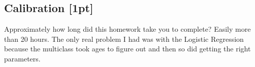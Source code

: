 \documentclass[submit]{harvardml}
\begin{document}


\newpage
\subsection*{Calibration [1pt]}
Approximately how long did this homework take you to complete? Easily more than 20 hours.  The only real problem I had was with the Logistic Regression because the multiclass took ages to figure out and then so did getting the right parameters.  
\end{document}
